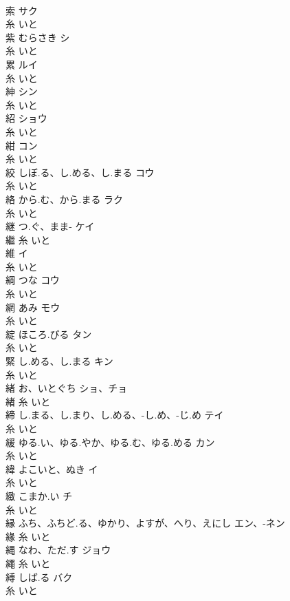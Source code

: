 \documentclass[8pt]{extreport}
\begin{document}
\begin{CJK}{UTF8}{min}
\\	索		サク	
\\	糸		いと		
\\	紫	むらさき	シ	
\\	糸		いと		
\\	累		ルイ	
\\	糸		いと		
\\	紳		シン	
\\	糸		いと		
\\	紹		ショウ	
\\	糸		いと		
\\	紺		コン	
\\	糸		いと		
\\	絞	しぼ.る、し.める、し.まる	コウ	
\\	糸		いと		
\\	絡	から.む、から.まる	ラク	
\\	糸		いと		
\\	継	つ.ぐ、まま-	ケイ	
\\	繼	糸		いと		
\\	維		イ	
\\	糸		いと		
\\	綱	つな	コウ	
\\	糸		いと		
\\	網	あみ	モウ	
\\	糸		いと		
\\	綻	ほころ.びる	タン	
\\	糸		いと		
\\	緊	し.める、し.まる	キン	
\\	糸		いと		
\\	緒	お、いとぐち	ショ、チョ	
\\	緖	糸		いと		
\\	締	し.まる、し.まり、し.める、-し.め、-じ.め	テイ	
\\	糸		いと		
\\	緩	ゆる.い、ゆる.やか、ゆる.む、ゆる.める	カン	
\\	糸		いと		
\\	緯	よこいと、ぬき	イ	
\\	糸		いと		
\\	緻	こまか.い	チ	
\\	糸		いと		
\\	縁	ふち、ふちど.る、ゆかり、よすが、へり、えにし	エン、-ネン	
\\	緣	糸		いと		
\\	縄	なわ、ただ.す	ジョウ	
\\	繩	糸		いと		
\\	縛	しば.る	バク	
\\	糸		いと		

\end{CJK}
\end{document}
